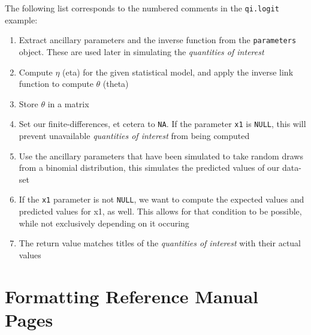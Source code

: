 The following list corresponds to the numbered comments in the {\tt qi.logit} example:

\begin{enumerate}
	\item{Extract ancillary parameters and the inverse function from the {\tt parameters} object.  These are used later in simulating the \emph{quantities of interest}}
	\item{Compute $\eta$ (eta) for the given statistical model, and apply the inverse link function to compute $\theta$ (theta)}
	\item{Store $\theta$ in a matrix}
	\item{Set our finite-differences, et cetera to {\tt NA}.  If the parameter {\tt x1} is {\tt NULL}, this will prevent unavailable \emph{quantities of interest} from being computed}
	\item{Use the ancillary parameters that have been simulated to take random draws from a binomial distribution, this simulates the predicted values of our data-set}
	\item{If the {\tt x1} parameter is not {\tt NULL}, we want to compute the expected values and predicted values for x1, as well.  This allows for that condition to be possible, while not exclusively depending on it occuring}
	\item{The return value matches titles of the \emph{quantities of interest} with their actual values}
\end{enumerate}



%

\section{Formatting Reference Manual Pages}  \label{s:format}

